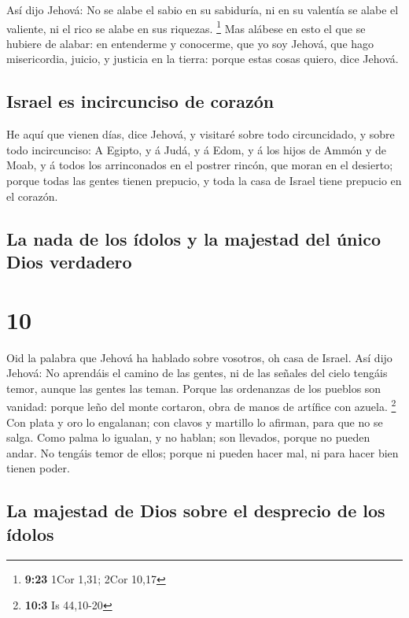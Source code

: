  Así dijo Jehová: No se alabe el sabio en su sabiduría, ni
en su valentía se alabe el valiente, ni el rico se alabe en sus
riquezas. \footnote{\textbf{9:23} 1Cor 1,31; 2Cor 10,17} 
Mas alábese en esto el que se hubiere de alabar: en entenderme y
conocerme, que yo soy Jehová, que hago misericordia, juicio, y justicia
en la tierra: porque estas cosas quiero, dice Jehová.

\hypertarget{israel-es-incircunciso-de-corazuxf3n}{%
\subsection{Israel es incircunciso de
corazón}\label{israel-es-incircunciso-de-corazuxf3n}}

 He aquí que vienen días, dice Jehová, y visitaré sobre
todo circuncidado, y sobre todo incircunciso:  A Egipto, y
á Judá, y á Edom, y á los hijos de Ammón y de Moab, y á todos los
arrinconados en el postrer rincón, que moran en el desierto; porque
todas las gentes tienen prepucio, y toda la casa de Israel tiene
prepucio en el corazón.

\hypertarget{la-nada-de-los-uxeddolos-y-la-majestad-del-uxfanico-dios-verdadero}{%
\subsection{La nada de los ídolos y la majestad del único Dios
verdadero}\label{la-nada-de-los-uxeddolos-y-la-majestad-del-uxfanico-dios-verdadero}}

\hypertarget{section-9}{%
\section{10}\label{section-9}}

 Oid la palabra que Jehová ha hablado sobre vosotros, oh
casa de Israel.  Así dijo Jehová: No aprendáis el camino de
las gentes, ni de las señales del cielo tengáis temor, aunque las gentes
las teman.  Porque las ordenanzas de los pueblos son
vanidad: porque leño del monte cortaron, obra de manos de artífice con
azuela. \footnote{\textbf{10:3} Is 44,10-20}  Con plata y
oro lo engalanan; con clavos y martillo lo afirman, para que no se
salga.  Como palma lo igualan, y no hablan; son llevados,
porque no pueden andar. No tengáis temor de ellos; porque ni pueden
hacer mal, ni para hacer bien tienen poder.

\hypertarget{la-majestad-de-dios-sobre-el-desprecio-de-los-uxeddolos}{%
\subsection{La majestad de Dios sobre el desprecio de los
ídolos}\label{la-majestad-de-dios-sobre-el-desprecio-de-los-uxeddolos}}

